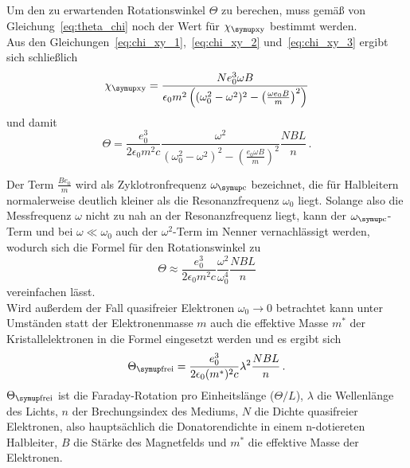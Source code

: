 Um den zu erwartenden Rotationswinkel $\Theta$ zu berechen, muss gemäß von Gleichung~\eqref{eq:theta_chi} noch der Wert für $\chi_\T{xy}$ bestimmt werden. \\
Aus den Gleichungen~\eqref{eq:chi_xy_1},~\eqref{eq:chi_xy_2} und~\eqref{eq:chi_xy_3} ergibt sich schließlich
\begin{equation}
    \chi_\T{xy} = \frac{N e_0^3 \omega B}{\epsilon_0 m^2 \left((\omega_0^2 - \omega^2)^2 -\left(\frac{\omega e_0 B}{m}\right)^2\right)} 
    \label{eq:chi_xy}
\end{equation}
und damit 
\begin{equation}
    \Theta = \frac{e_0^3}{2\epsilon_0 m^2 c}\frac{\omega^2}{\left(\omega_0^2-\omega^2\right)^2 - \left(\frac{e_0\omega B}{m}\right)^2}\frac{NBL}{n} \, .
\end{equation}

Der Term $\frac{Be_0}{m}$ wird als Zyklotronfrequenz $\omega_\T{c}$ bezeichnet, die für Halbleitern normalerweise deutlich kleiner als die Resonanzfrequenz $\omega_0$ liegt. Solange also die Messfrequenz $\omega$ nicht zu nah an der Resonanzfrequenz liegt, kann der $\omega_\T{c}$-Term und bei $\omega \ll \omega_0$ auch der $\omega^2$-Term im Nenner vernachlässigt werden, wodurch sich die Formel für den Rotationswinkel zu
\begin{equation}
    \Theta \approx \frac{e_0^3}{2\epsilon_0 m^2 c}\frac{\omega^2}{\omega_0^4}\frac{NBL}{n}
\end{equation} 
vereinfachen lässt. \\
Wird außerdem der Fall quasifreier Elektronen $\omega_0 \rightarrow 0$ betrachtet kann unter Umständen statt der Elektronenmasse $m$ auch die effektive Masse $m^*$ der Kristallelektronen in die Formel eingesetzt werden und es ergibt sich 
\begin{equation}
    \Theta_\T{frei} = \frac{e_0^3}{2\epsilon_0 (m^*)^2 c}\lambda^2 \frac{NBL}{n} \, .
    \label{eq:theta_faraday}
\end{equation}
$\Theta_\T{frei}$ ist die Faraday-Rotation pro Einheitslänge ($\Theta / L$), $\lambda$ die Wellenlänge des Lichts, $n$ der Brechungsindex des Mediums, $N$ die Dichte quasifreier Elektronen, also hauptsächlich die Donatorendichte in einem n-dotiereten Halbleiter, $B$ die Stärke des Magnetfelds und $m^*$ die effektive Masse der Elektronen. 

\clearpage